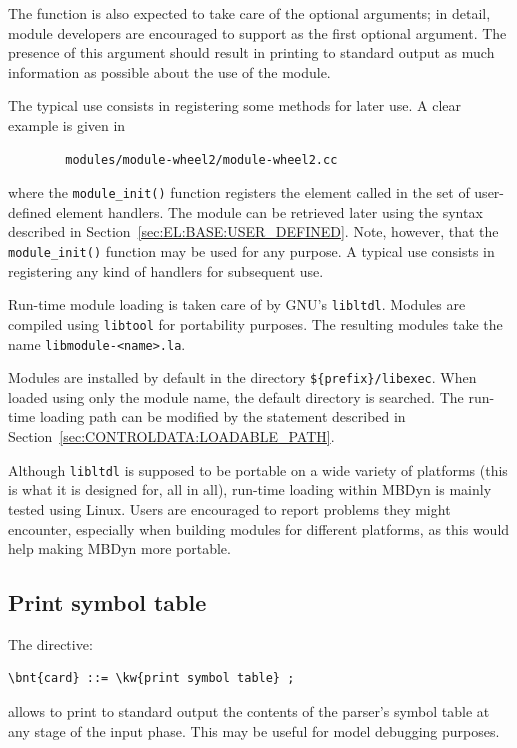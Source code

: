 The function is also expected to take care of the optional 
arguments; in detail, module developers are encouraged to support
 as the first optional argument.
The presence of this argument should result in printing to standard output
as much information as possible about the use of the module.

The typical use consists in registering some methods for later use.
A clear example is given in
\begin{verbatim}
        modules/module-wheel2/module-wheel2.cc
\end{verbatim}
where the \texttt{module\_init()} function registers
the  element called 
in the set of user-defined element handlers.
The module can be retrieved later using the syntax described
in Section~\ref{sec:EL:BASE:USER_DEFINED}.
Note, however, that the \texttt{module\_init()} function may be used
for any purpose.
A typical use consists in registering any kind of handlers
for subsequent use.

Run-time module loading is taken care of by GNU's \texttt{libltdl}.
Modules are compiled using \texttt{libtool} for portability purposes.
The resulting modules take the name
\texttt{libmodule-<name>.la}.

Modules are installed by default in the directory
\texttt{\$\{prefix\}/libexec}.
When loaded using only the module name, the default directory is searched.
The run-time loading path can be modified by the 
 statement described
in Section~\ref{sec:CONTROLDATA:LOADABLE_PATH}.

Although \texttt{libltdl} is supposed to be portable on a wide variety
of platforms (this is what it is designed for, all in all),
run-time loading within MBDyn is mainly tested using Linux.
Users are encouraged to report problems they might encounter,
especially when building modules for different platforms,
as this would help making MBDyn more portable.



\subsection{Print symbol table}
The  directive:
\begin{Verbatim}[commandchars=\\\{\}]
    \bnt{card} ::= \kw{print symbol table} ;
\end{Verbatim}
allows to print to standard output the contents of the parser's symbol
table at any stage of the input phase.
This may be useful for model debugging purposes.



